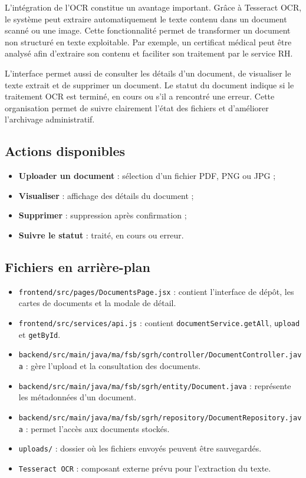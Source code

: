 \documentclass[12pt,a4paper]{report}
\begin{document}
L'intégration de l'OCR constitue un avantage important. Grâce à Tesseract OCR, le système peut extraire automatiquement le texte contenu dans un document scanné ou une image. Cette fonctionnalité permet de transformer un document non structuré en texte exploitable. Par exemple, un certificat médical peut être analysé afin d'extraire son contenu et faciliter son traitement par le service RH.

L'interface permet aussi de consulter les détails d'un document, de visualiser le texte extrait et de supprimer un document. Le statut du document indique si le traitement OCR est terminé, en cours ou s'il a rencontré une erreur. Cette organisation permet de suivre clairement l'état des fichiers et d'améliorer l'archivage administratif.

\subsection{Actions disponibles}

\begin{itemize}
    \item \textbf{Uploader un document} : sélection d'un fichier PDF, PNG ou JPG ;
    \item \textbf{Visualiser} : affichage des détails du document ;
    \item \textbf{Supprimer} : suppression après confirmation ;
    \item \textbf{Suivre le statut} : traité, en cours ou erreur.
\end{itemize}

\subsection{Fichiers en arrière-plan}

\begin{itemize}
    \item \texttt{frontend/src/pages/DocumentsPage.jsx} : contient l'interface de dépôt, les cartes de documents et la modale de détail.
    \item \texttt{frontend/src/services/api.js} : contient \texttt{documentService.getAll}, \texttt{upload} et \texttt{getById}.
    \item \texttt{backend/src/main/java/ma/fsb/sgrh/controller/DocumentController.java} : gère l'upload et la consultation des documents.
    \item \texttt{backend/src/main/java/ma/fsb/sgrh/entity/Document.java} : représente les métadonnées d'un document.
    \item \texttt{backend/src/main/java/ma/fsb/sgrh/repository/DocumentRepository.java} : permet l'accès aux documents stockés.
    \item \texttt{uploads/} : dossier où les fichiers envoyés peuvent être sauvegardés.
    \item \texttt{Tesseract OCR} : composant externe prévu pour l'extraction du texte.
\end{itemize}
\end{document}

